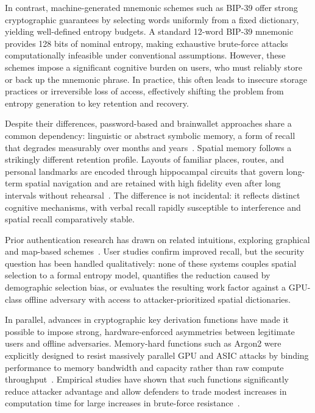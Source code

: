 \documentclass[journal,article,accept,pdftex,moreauthors]{Definitions/mdpi}
\begin{document}
In contrast, machine-generated mnemonic schemes such as BIP-39 offer strong cryptographic guarantees by selecting words uniformly from a fixed dictionary, yielding well-defined entropy budgets. A standard 12-word BIP-39 mnemonic provides 128 bits of nominal entropy, making exhaustive brute-force attacks computationally infeasible under conventional assumptions. However, these schemes impose a significant cognitive burden on users, who must reliably store or back up the mnemonic phrase. In practice, this often leads to insecure storage practices or irreversible loss of access, effectively shifting the problem from entropy generation to key retention and recovery.

Despite their differences, password-based and brainwallet approaches share a common dependency: linguistic or abstract symbolic memory, a form of recall that degrades measurably over months and years~\cite{Pals2018,Akaygun2014}. Spatial memory follows a strikingly different retention profile. Layouts of familiar places, routes, and personal landmarks are encoded through hippocampal circuits that govern long-term spatial navigation and are retained with high fidelity even after long intervals without rehearsal~\cite{Montello1998,McNamara2003,McNamara2012,McNaughton1991}. The difference is not incidental: it reflects distinct cognitive mechanisms, with verbal recall rapidly susceptible to interference and spatial recall comparatively stable.

Prior authentication research has drawn on related intuitions, exploring graphical and map-based schemes~\cite{Tari2006,Golla2017,Sun2012,Thorpe2013}. User studies confirm improved recall, but the security question has been handled qualitatively: none of these systems couples spatial selection to a formal entropy model, quantifies the reduction caused by demographic selection bias, or evaluates the resulting work factor against a GPU-class offline adversary with access to attacker-prioritized spatial dictionaries.

In parallel, advances in cryptographic key derivation functions have made it possible to impose strong, hardware-enforced asymmetries between legitimate users and offline adversaries. Memory-hard functions such as Argon2 were explicitly designed to resist massively parallel GPU and ASIC attacks by binding performance to memory bandwidth and capacity rather than raw compute throughput~\cite{7467361,Wetzels2016}. Empirical studies have shown that such functions significantly reduce attacker advantage and allow defenders to trade modest increases in computation time for large increases in brute-force resistance~\cite{Choe2019}.
\end{document}
